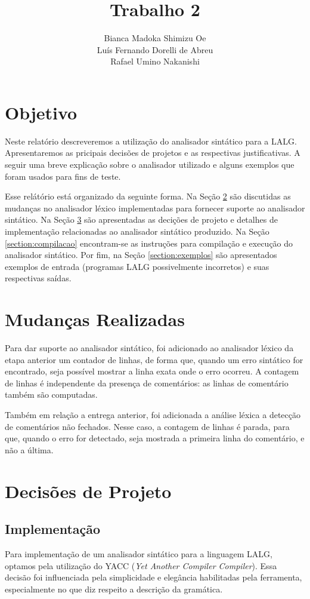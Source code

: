 \documentclass {article}
\title {Trabalho 2}
\author {Bianca Madoka Shimizu Oe \\ 
		Luís Fernando Dorelli de Abreu \\  
		Rafael Umino Nakanishi}
\begin{document}
\titlepage
\maketitle

\section{Objetivo}
	Neste relatório descreveremos a utilização do analisador sintático para a LALG. Apresentaremos as pricipais decisões de projetos e as respectivas justificativas. A seguir uma breve explicação sobre o analisador utilizado e alguns exemplos que foram usados para fins de teste.

	Esse relátório está organizado da seguinte forma. Na Seção \ref{section:lex} são discutidas as mudanças no analisador léxico implementadas para fornecer suporte ao analisador sintático. Na Seção \ref{section:decisoes} são apresentadas as decições de projeto e detalhes de implementação relacionadas ao analisador sintático produzido. Na Seção \ref{section:compilacao} encontram-se as instruções para compilação e execução do analisador sintático. Por fim, na Seção \ref{section:exemplos} são apresentados exemplos de entrada (programas LALG possivelmente incorretos) e suas respectivas saídas.

\section{Mudanças Realizadas}\label{section:lex}

	Para dar suporte ao analisador sintático, foi adicionado ao analisador léxico da etapa anterior um contador de linhas, de forma que, quando um erro sintático for encontrado, seja possível mostrar a linha exata onde o erro ocorreu. A contagem de linhas é independente da presença de comentários: as linhas de comentário também são computadas.

	Também em relação a entrega anterior, foi adicionada a análise léxica a detecção de comentários não fechados. Nesse caso, a contagem de linhas é parada, para que, quando o erro for detectado, seja mostrada a primeira linha do comentário, e não a última. 

\section{Decisões de Projeto}\label{section:decisoes}
	\subsection{Implementação}
		Para implementação de um analisador sintático para a linguagem LALG, optamos pela utilização do YACC (\emph{Yet Another Compiler Compiler}). Essa decisão foi influenciada pela simplicidade e elegância habilitadas pela ferramenta, especialmente no que diz respeito a descrição da gramática.  
\end{document}
